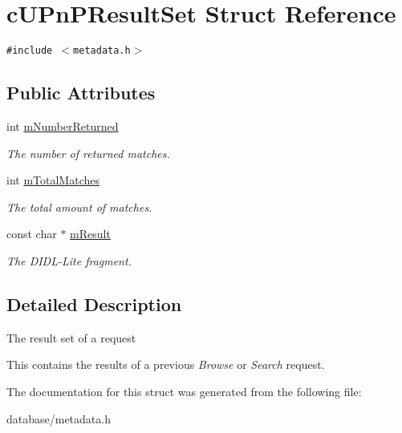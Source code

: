 \hypertarget{structcUPnPResultSet}{
\section{cUPnPResultSet Struct Reference}
\label{structcUPnPResultSet}
}
{\tt \#include $<$metadata.h$>$}

\subsection*{Public Attributes}
\begin{CompactItemize}
\item 
\hypertarget{structcUPnPResultSet_94b5bc7673773e674a81d0c5adc7f4e7}{
int \hyperlink{structcUPnPResultSet_94b5bc7673773e674a81d0c5adc7f4e7}{mNumberReturned}}
\label{structcUPnPResultSet_94b5bc7673773e674a81d0c5adc7f4e7}

\begin{CompactList}\small\item\em The number of returned matches. \item\end{CompactList}\item 
\hypertarget{structcUPnPResultSet_78bd90b56bfc5804e54df6579cd8e541}{
int \hyperlink{structcUPnPResultSet_78bd90b56bfc5804e54df6579cd8e541}{mTotalMatches}}
\label{structcUPnPResultSet_78bd90b56bfc5804e54df6579cd8e541}

\begin{CompactList}\small\item\em The total amount of matches. \item\end{CompactList}\item 
\hypertarget{structcUPnPResultSet_7e891eca2a37daea6285d2f7a2731c1d}{
const char $\ast$ \hyperlink{structcUPnPResultSet_7e891eca2a37daea6285d2f7a2731c1d}{mResult}}
\label{structcUPnPResultSet_7e891eca2a37daea6285d2f7a2731c1d}

\begin{CompactList}\small\item\em The DIDL-Lite fragment. \item\end{CompactList}\end{CompactItemize}


\subsection{Detailed Description}
The result set of a request

This contains the results of a previous {\em Browse\/} or {\em Search\/} request. 

The documentation for this struct was generated from the following file:\begin{CompactItemize}
\item 
database/metadata.h\end{CompactItemize}
